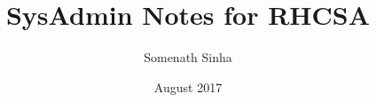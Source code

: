 

\title{SysAdmin Notes for RHCSA}
\author{Somenath Sinha}
\date{August 2017}


	\maketitle
	\newpage
	\tableofcontents

	
	
	
	
	
	
